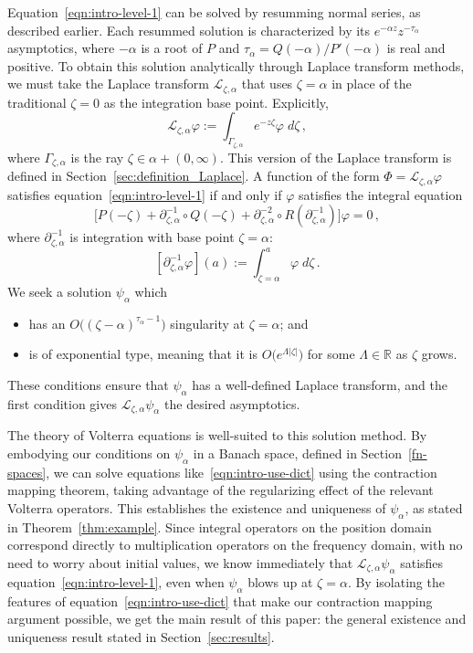 \documentclass[final]{siamart220329}
\newcommand{\R}{\mathbb{R}}
\newcommand{\laplace}{\mathcal{L}}
\newenvironment{revtwo}{\color{revred}}{\color{black}}
\newenvironment{revtwo}{}{}
\begin{document}
Equation~\eqref{eqn:intro-level-1} can be solved by resumming normal series, as described earlier. Each resummed solution is characterized by its $e^{-\alpha z} z^{-\tau_\alpha}$ asymptotics, where $-\alpha$ is a root of $P$ and $\tau_\alpha = Q(-\alpha)/P'(-\alpha)$ is real and positive. To obtain this solution analytically through Laplace transform methods, we must take the Laplace transform $\laplace_{\zeta,\alpha}$ that uses $\zeta = \alpha$ in place of the traditional $\zeta = 0$ as the integration base point. \begin{revtwo}
Explicitly,
\[ \laplace_{\zeta,\alpha} \varphi := \int_{\Gamma_{\zeta,\alpha}} e^{-z\zeta} \varphi\;d\zeta\,, \]
where $\Gamma_{\zeta,\alpha}$ is the ray $\zeta \in \alpha + (0, \infty)$.    
This version of the Laplace transform is defined in Section~\ref{sec:definition_Laplace}. A function of the form $\Phi = \laplace_{\zeta, \alpha} \varphi$ satisfies equation~\eqref{eqn:intro-level-1} if and only if $\varphi$ satisfies the integral equation
\[ \big[ P(-\zeta)+\partial_{\zeta,\alpha}^{-1}\circ Q(-\zeta)+\partial_{\zeta,\alpha}^{-2}\circ R(\partial_{\zeta,\alpha}^{-1}) \big] \varphi = 0\,, \]
where $\partial^{-1}_{\zeta, \alpha}$ is integration with base point $\zeta = \alpha$:
\[ [\partial^{-1}_{\zeta, \alpha} \varphi](a) := \int_{\zeta = \alpha}^a \varphi\;d\zeta\,. \]
We seek a solution $\psi_\alpha$ which
\begin{itemize}
\item has an $O\big((\zeta - \alpha)^{\tau_\alpha-1}\big)$ singularity at $\zeta = \alpha$; and
\item is of exponential type, meaning that it is $O\big(e^{\Lambda|\zeta|}\big)$ for some $\Lambda \in \R$ as $\zeta$ grows.
\end{itemize}
These conditions ensure that $\psi_\alpha$ has a well-defined Laplace transform, and the first condition gives $\laplace_{\zeta, \alpha} \psi_\alpha$ the desired asymptotics.
\end{revtwo}  

The theory of Volterra equations is well-suited to this solution method. By embodying our conditions on $\psi_\alpha$ in a Banach space, defined in Section~\ref{fn-spaces}, we can solve equations like~\eqref{eqn:intro-use-dict} using the contraction mapping theorem, taking advantage of the regularizing effect of the relevant Volterra operators. This establishes the existence and uniqueness of $\psi_\alpha$, as stated in Theorem~\ref{thm:example}. Since integral operators on the position domain correspond directly to multiplication operators on the frequency domain, with no need to worry about initial values, we know immediately that $\laplace_{\zeta, \alpha} \psi_\alpha$ satisfies equation~\eqref{eqn:intro-level-1}, even when $\psi_\alpha$ blows up at $\zeta = \alpha$. By isolating the features of equation~\eqref{eqn:intro-use-dict} that make our contraction mapping argument possible, we get the main result of this paper: the general existence and uniqueness result stated in Section~\ref{sec:results}.
\end{document}
